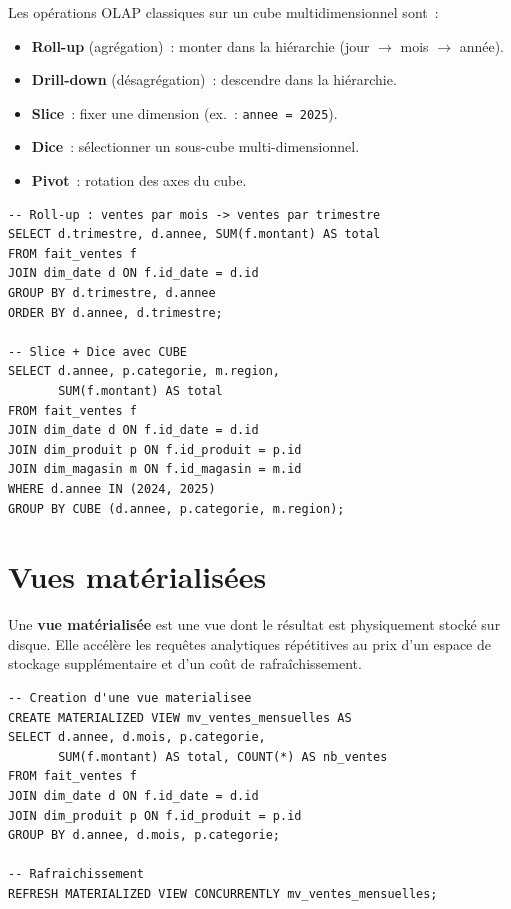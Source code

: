 \begin{definition}
Les op\'erations OLAP classiques sur un cube multidimensionnel sont~:
\begin{itemize}
  \item \textbf{Roll-up} (agr\'egation)~: monter dans la hi\'erarchie
        (jour $\to$ mois $\to$ ann\'ee).
  \item \textbf{Drill-down} (d\'esagr\'egation)~: descendre dans la hi\'erarchie.
  \item \textbf{Slice}~: fixer une dimension (ex.~: \texttt{annee = 2025}).
  \item \textbf{Dice}~: s\'electionner un sous-cube multi-dimensionnel.
  \item \textbf{Pivot}~: rotation des axes du cube.
\end{itemize}
\end{definition}

\begin{verbatim}
-- Roll-up : ventes par mois -> ventes par trimestre
SELECT d.trimestre, d.annee, SUM(f.montant) AS total
FROM fait_ventes f
JOIN dim_date d ON f.id_date = d.id
GROUP BY d.trimestre, d.annee
ORDER BY d.annee, d.trimestre;

-- Slice + Dice avec CUBE
SELECT d.annee, p.categorie, m.region,
       SUM(f.montant) AS total
FROM fait_ventes f
JOIN dim_date d ON f.id_date = d.id
JOIN dim_produit p ON f.id_produit = p.id
JOIN dim_magasin m ON f.id_magasin = m.id
WHERE d.annee IN (2024, 2025)
GROUP BY CUBE (d.annee, p.categorie, m.region);
\end{verbatim}

\section{Vues mat\'erialis\'ees}

\begin{definition}
Une \textbf{vue mat\'erialis\'ee} est une vue dont le r\'esultat est
physiquement stock\'e sur disque. Elle acc\'el\`ere les requ\^etes
analytiques r\'ep\'etitives au prix d'un espace de stockage suppl\'ementaire
et d'un co\^ut de rafra\^ichissement.
\end{definition}

\begin{verbatim}
-- Creation d'une vue materialisee
CREATE MATERIALIZED VIEW mv_ventes_mensuelles AS
SELECT d.annee, d.mois, p.categorie,
       SUM(f.montant) AS total, COUNT(*) AS nb_ventes
FROM fait_ventes f
JOIN dim_date d ON f.id_date = d.id
JOIN dim_produit p ON f.id_produit = p.id
GROUP BY d.annee, d.mois, p.categorie;

-- Rafraichissement
REFRESH MATERIALIZED VIEW CONCURRENTLY mv_ventes_mensuelles;
\end{verbatim}

